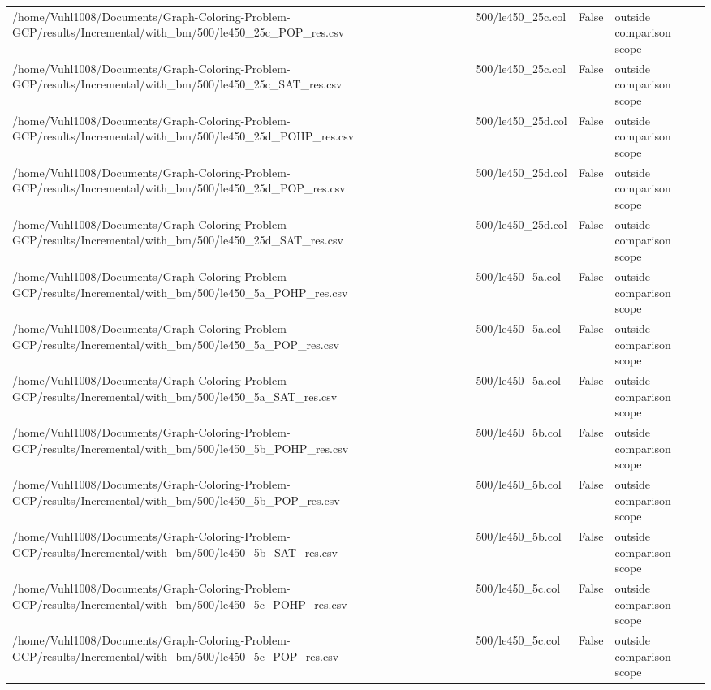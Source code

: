 \begin{table}[htbp]
\begin{tabular}{llll}
/home/Vuhl1008/Documents/Graph-Coloring-Problem-GCP/results/Incremental/with\_bm/500/le450\_25c\_POP\_res.csv & 500/le450\_25c.col & False & outside comparison scope \\
/home/Vuhl1008/Documents/Graph-Coloring-Problem-GCP/results/Incremental/with\_bm/500/le450\_25c\_SAT\_res.csv & 500/le450\_25c.col & False & outside comparison scope \\
/home/Vuhl1008/Documents/Graph-Coloring-Problem-GCP/results/Incremental/with\_bm/500/le450\_25d\_POHP\_res.csv & 500/le450\_25d.col & False & outside comparison scope \\
/home/Vuhl1008/Documents/Graph-Coloring-Problem-GCP/results/Incremental/with\_bm/500/le450\_25d\_POP\_res.csv & 500/le450\_25d.col & False & outside comparison scope \\
/home/Vuhl1008/Documents/Graph-Coloring-Problem-GCP/results/Incremental/with\_bm/500/le450\_25d\_SAT\_res.csv & 500/le450\_25d.col & False & outside comparison scope \\
/home/Vuhl1008/Documents/Graph-Coloring-Problem-GCP/results/Incremental/with\_bm/500/le450\_5a\_POHP\_res.csv & 500/le450\_5a.col & False & outside comparison scope \\
/home/Vuhl1008/Documents/Graph-Coloring-Problem-GCP/results/Incremental/with\_bm/500/le450\_5a\_POP\_res.csv & 500/le450\_5a.col & False & outside comparison scope \\
/home/Vuhl1008/Documents/Graph-Coloring-Problem-GCP/results/Incremental/with\_bm/500/le450\_5a\_SAT\_res.csv & 500/le450\_5a.col & False & outside comparison scope \\
/home/Vuhl1008/Documents/Graph-Coloring-Problem-GCP/results/Incremental/with\_bm/500/le450\_5b\_POHP\_res.csv & 500/le450\_5b.col & False & outside comparison scope \\
/home/Vuhl1008/Documents/Graph-Coloring-Problem-GCP/results/Incremental/with\_bm/500/le450\_5b\_POP\_res.csv & 500/le450\_5b.col & False & outside comparison scope \\
/home/Vuhl1008/Documents/Graph-Coloring-Problem-GCP/results/Incremental/with\_bm/500/le450\_5b\_SAT\_res.csv & 500/le450\_5b.col & False & outside comparison scope \\
/home/Vuhl1008/Documents/Graph-Coloring-Problem-GCP/results/Incremental/with\_bm/500/le450\_5c\_POHP\_res.csv & 500/le450\_5c.col & False & outside comparison scope \\
/home/Vuhl1008/Documents/Graph-Coloring-Problem-GCP/results/Incremental/with\_bm/500/le450\_5c\_POP\_res.csv & 500/le450\_5c.col & False & outside comparison scope \\

\end{tabular}
\end{table}
